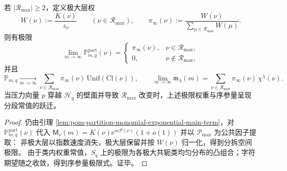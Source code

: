\begin{theorem}\label{thm:pom-symmetric-group-gibbs-mixture}
若 \(|\mathcal{R}_{\max}|\ge 2\)，定义极大层权
\[
W(\nu):=\frac{K(\nu)}{z_\nu}\qquad(\nu\in\mathcal{R}_{\max}),
\qquad
\pi_\infty(\nu):=\frac{W(\nu)}{\sum_{\mu\in\mathcal{R}_{\max}}W(\mu)}.
\]
则有极限
\[
\lim_{m\to\infty}\mathbb P^{\mathrm{part}}_{m,q}(\nu)=
\begin{cases}
\pi_\infty(\nu),& \nu\in\mathcal{R}_{\max},\\
0,& \nu\notin\mathcal{R}_{\max},
\end{cases}
\]
并且
\[
\mathbb P_{m,q}\xrightarrow[m\to\infty]{}\sum_{\nu\in\mathcal{R}_{\max}}\pi_\infty(\nu)\,\mathrm{Unif}(\mathrm{Cl}(\nu)),
\qquad
\lim_{m\to\infty}\mathfrak m_\lambda(m)=\sum_{\nu\in\mathcal{R}_{\max}}\pi_\infty(\nu)\,\chi^\lambda(\nu).
\]
当压力向量 \(p\) 穿越 \(\mathcal{H}_q\) 的壁面并导致 \(\mathcal{R}_{\max}\) 改变时，上述极限权重与序参量呈现分段常值的跃迁。
\end{theorem}
\begin{proof}
仍由引理 \ref{lem:pom-partition-monomial-exponential-main-term}，对 \(\mathbb P_{m,q}^{\mathrm{part}}(\nu)\) 代入
\(
\mathsf{M}_\nu(m)=K(\nu)e^{m\mathcal{P}(\nu)}(1+o(1))
\)
并以 \(\mathcal{P}_{\max}\) 为公共因子提取：
非极大层以指数速度消失，极大层保留并按 \(W(\nu)\) 归一化，得到分拆空间极限。
由于类内权重常值，\(S_q\) 上的极限为各极大共轭类均匀分布的凸组合；字符期望随之收敛，得到序参量极限式。证毕。
\end{proof}


